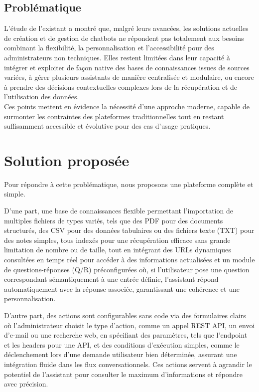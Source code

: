 \subsection{Problématique}
L’étude de l’existant a montré que, malgré leurs avancées, les solutions actuelles de création et de gestion de chatbots ne répondent pas totalement aux besoins combinant la flexibilité, la personnalisation et l'accessibilité pour des administrateurs non techniques. Elles restent limitées dans leur capacité à intégrer et exploiter de façon native des bases de connaissances issues de sources variées, à gérer plusieurs assistants de manière centralisée et modulaire, ou encore à prendre des décisions contextuelles complexes lors de la récupération et de l’utilisation des données.\\
Ces points mettent en évidence la nécessité d’une approche moderne, capable de surmonter les contraintes des plateformes traditionnelles tout en restant suffisamment accessible et évolutive pour des cas d’usage pratiques.
\section{Solution proposée}
Pour répondre à cette problématique, nous proposons une plateforme complète et simple.

D'une part, une base de connaissances flexible permettant l'importation de multiples fichiers de types variés, tels que des PDF pour des documents structurés, des CSV pour des données tabulaires ou des fichiers texte (TXT) pour des notes simples, tous indexés pour une récupération efficace sans grande limitation de nombre ou de taille, tout en intégrant des URLs dynamiques consultées en temps réel pour accéder à des informations actualisées et un module de questions-réponses (Q/R) préconfigurées où, si l'utilisateur pose une question correspondant sémantiquement à une entrée définie, l'assistant répond automatiquement avec la réponse associée, garantissant une cohérence et une personnalisation.

D'autre part, des actions sont configurables sans code via des formulaires clairs où l'administrateur choisit le type d'action, comme un appel REST API, un envoi d'e-mail ou une recherche web, en spécifiant des paramètres, tels que l'endpoint et les headers pour une API, et des conditions d'exécution simples, comme le déclenchement lors d'une demande utilisateur bien déterminée, assurant une intégration fluide dans les flux conversationnels. Ces actions servent à agrandir le potentiel de l'assistant pour consulter le maximum d'informations et répondre avec précision.

